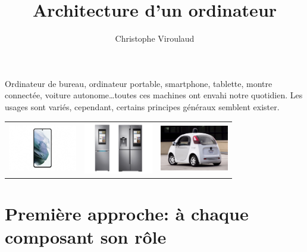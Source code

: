 \documentclass[svgnames,11pt]{beamer}
\author[]{Christophe Viroulaud}
\title{Architecture d'un ordinateur}
\date{\framebox{\textbf{ArchMat 01}}}
\institute{Première - NSI}
\begin{document}
\begin{frame}
\titlepage
\end{frame}
\begin{frame}
    \frametitle{}

Ordinateur de bureau, ordinateur portable, smartphone, tablette, montre connectée, voiture autonome\dots toutes ces machines ont envahi notre quotidien. Les usages sont variés, cependant, certains principes généraux semblent exister.
\begin{center}
    \begin{tabular}{ccc}
        \includegraphics[width=3cm]{ressources/smartphone.jpeg}&
        \includegraphics[width=3cm]{ressources/frigo.png}&
        \includegraphics[width=3cm]{ressources/voiture.jpg}
    \end{tabular}
\end{center}

\end{frame}
\section{Première approche: à chaque composant son rôle}
\end{document}

